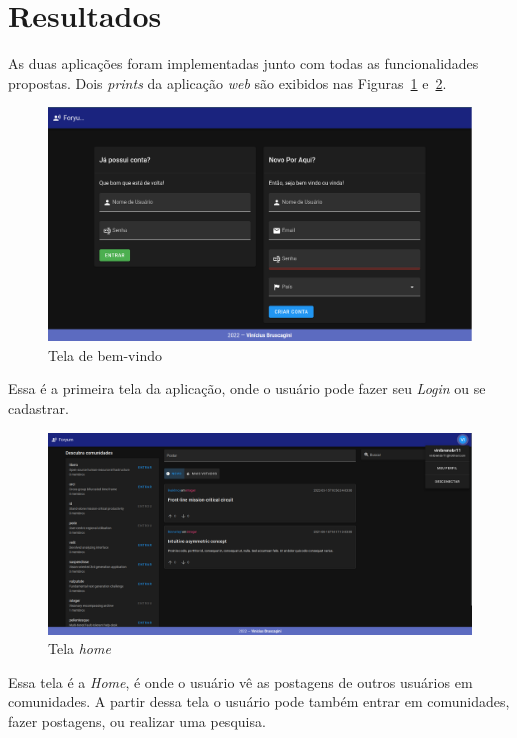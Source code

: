 \documentclass[12pt]{article}
\begin{document}
\section{Resultados}\label{Resultados}

As duas aplicações foram implementadas junto com todas as funcionalidades propostas.
Dois \textit{prints} da aplicação \textit{web} são exibidos nas Figuras~\ref{fig:welcome} e~\ref{fig:home}.

\begin{figure}[H]
    \centering
    \includegraphics[width=1\textwidth]{prints/welcome.png}
    \caption{Tela de bem-vindo}\label{fig:welcome}
\end{figure}

Essa é a primeira tela da aplicação, onde o usuário pode fazer seu \textit{Login} ou se cadastrar.

\begin{figure}[H]
    \centering
    \includegraphics[width=1\textwidth]{prints/home.png}
    \caption{Tela \textit{home}}\label{fig:home}
\end{figure}

Essa tela é a \textit{Home}, é onde o usuário vê as postagens de outros usuários em comunidades.
A partir dessa tela o usuário pode também entrar em comunidades, fazer postagens, ou realizar uma pesquisa.
\end{document}

